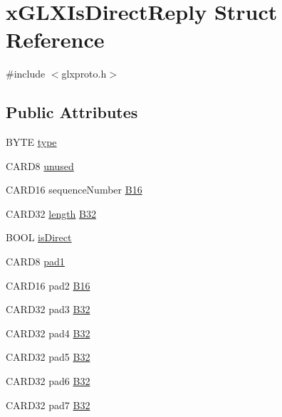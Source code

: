 \hypertarget{structx_g_l_x_is_direct_reply}{}\section{x\+G\+L\+X\+Is\+Direct\+Reply Struct Reference}
\label{structx_g_l_x_is_direct_reply}


{\ttfamily \#include $<$glxproto.\+h$>$}

\subsection*{Public Attributes}
\begin{DoxyCompactItemize}
\item 
B\+Y\+TE \hyperlink{structx_g_l_x_is_direct_reply_a525b99fb710e7d0b7728ef4cb468384f}{type}
\item 
C\+A\+R\+D8 \hyperlink{structx_g_l_x_is_direct_reply_a28756f6cef771dcb9ed0fd691d3165c5}{unused}
\item 
C\+A\+R\+D16 sequence\+Number \hyperlink{structx_g_l_x_is_direct_reply_a281f461fbd2e83b0234e321c6cbf23d7}{B16}
\item 
C\+A\+R\+D32 \hyperlink{glcorearb_8h_ab9c919755bde3b34349e23a32b4e0fa7}{length} \hyperlink{structx_g_l_x_is_direct_reply_aa1406a879be613af3584478acdb1d275}{B32}
\item 
B\+O\+OL \hyperlink{structx_g_l_x_is_direct_reply_ae4a23b4c4b762c912683f971c7d14732}{is\+Direct}
\item 
C\+A\+R\+D8 \hyperlink{structx_g_l_x_is_direct_reply_aadb4db0345b8a575cc8b144d1a3db663}{pad1}
\item 
C\+A\+R\+D16 pad2 \hyperlink{structx_g_l_x_is_direct_reply_a65747a4898e90b36922731e09cd60d6f}{B16}
\item 
C\+A\+R\+D32 pad3 \hyperlink{structx_g_l_x_is_direct_reply_a7e9fa6b5ef13e8abc587e5b389e2a1ee}{B32}
\item 
C\+A\+R\+D32 pad4 \hyperlink{structx_g_l_x_is_direct_reply_a5a4aef4a5f3e8ee66eb315f8d40430fb}{B32}
\item 
C\+A\+R\+D32 pad5 \hyperlink{structx_g_l_x_is_direct_reply_a0bf84665e41365f5a4cb2d9955e1b81f}{B32}
\item 
C\+A\+R\+D32 pad6 \hyperlink{structx_g_l_x_is_direct_reply_a06a6283f1ea212d227f375347504a7ce}{B32}
\item 
C\+A\+R\+D32 pad7 \hyperlink{structx_g_l_x_is_direct_reply_a52c3ba59b8942103e7d9fa87c6cc726f}{B32}
\end{DoxyCompactItemize}


